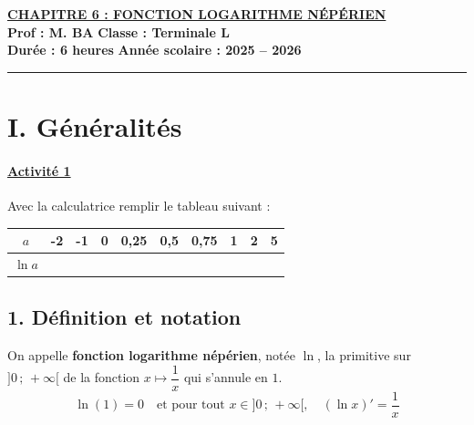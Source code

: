 \documentclass[12pt,a4paper]{article}
\begin{document}
\begin{center}
    \Large\textbf{\underline{\textcolor{myred}{CHAPITRE 6 : FONCTION LOGARITHME NÉPÉRIEN}}}\\[0.2cm]
    \normalsize\textbf{Prof : M. BA} \hfill \textbf{Classe : Terminale L}\\[0.1cm]
    \textbf{Durée : 6 heures} \hfill \textbf{Année scolaire : 2025 -- 2026}
\end{center}
\hrule
\vspace{0.3cm}


\section*{\color{myred}I. Généralités}

\paragraph{\underline{Activité 1}}
Avec la calculatrice remplir le tableau suivant :

\begin{center}
\renewcommand{\arraystretch}{1.5}
\begin{tabular}{|c|c|c|c|c|c|c|c|c|c|}
\hline
$a$ & -2 & -1 & 0 & 0,25 & 0,5 & 0,75 & 1 & 2 & 5 \\
\hline
$\ln a$ & \hspace*{0.6cm} & \hspace*{0.6cm} & \hspace*{0.6cm} & \hspace*{0.6cm} & \hspace*{0.6cm} & \hspace*{0.6cm} & \hspace*{0.6cm} & \hspace*{0.6cm} & \hspace*{0.6cm} \\
\hline
\end{tabular}
\end{center}

\vspace{0.3cm}

\subsection*{\color{myred}1. Définition et notation}
\begin{tcolorbox}[colback=blue!5!white,colframe=myblue,title=\textbf{Définition}]
On appelle \textbf{fonction logarithme népérien}, notée $\ln$, la primitive sur $]0\,;\,+\infty[$ de la fonction $x \mapsto \dfrac{1}{x}$ qui s'annule en $1$.
\[
\ln(1) = 0 \quad \text{et pour tout } x \in ]0\,;\,+\infty[, \quad (\ln x)' = \frac{1}{x}
\]
\end{tcolorbox}
\end{document}
